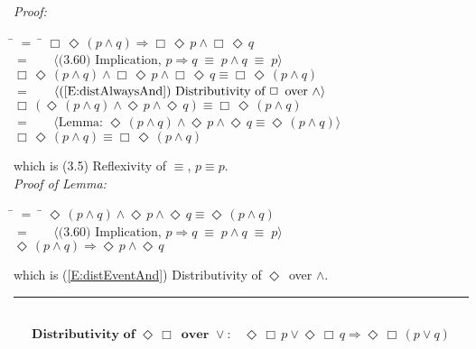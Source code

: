 \documentclass[fleqn, leqno]{article}
\newcommand{\lgap}{2pt}                             %
\newcommand{\mymathindent}{24pt}                    %
\newcommand{\equivs}{\ensuremath{\;\equiv\;}}       %
\newcommand{\impl}{\ensuremath{\Rightarrow}}        %
\newcommand{\Event}{\Diamond\,}
\newcommand{\Always}{\Box\,}
\newcommand{\myqed}{\hfill\rule[-.23ex]{1.2ex}{2.0ex}}
\newcommand{\Gll} {\langle}                         %
\newcommand{\Ggg} {\rangle}                         %
\newcommand{\Hint}[1]     {\ \ \ $\Gll              \mbox{#1} \Ggg$ }   %
\begin{document}
\emph{Proof:}
\begin{tabbing}
\hspace{\mymathindent} \= $= \;$ \= \kill
  \> \>   $\Always\Event(p \land q) \impl \Always\Event p \land \Always\Event q$\\[\lgap]
  \> $=$  \>  \Hint{(3.60) Implication, $p\impl q \equivs p\land q \equivs p$}\\[\lgap]
  \> \>   $\Always\Event(p \land q) \land \Always\Event p \land \Always\Event q \equiv \Always\Event(p \land q)$\\[\lgap]
  \> $=$  \>  \Hint{(\ref{E:distAlwaysAnd}) Distributivity of $\Always$ over $\land$}\\[\lgap]
  \> \>   $\Always(\Event(p \land q) \land \Event p \land \Event q) \equiv \Always\Event(p \land q)$\\[\lgap]
  \> $=$  \>  \Hint{Lemma: $\Event(p \land q) \land \Event p \land \Event q \equiv \Event(p \land q)$}\\[\lgap]
  \> \>   $\Always\Event(p \land q) \equiv \Always\Event(p \land q)$
\end{tabbing}
which is (3.5) Reflexivity of $\equiv$, $p\equiv p$.\\[\lgap]

\emph{Proof of Lemma:}
\begin{tabbing}
\hspace{\mymathindent} \= $= \;$ \= \kill
  \> \>   $\Event(p \land q) \land \Event p \land \Event q \equiv \Event(p \land q)$\\[\lgap]
  \> $=$  \>  \Hint{(3.60) Implication, $p\impl q \equivs p\land q \equivs p$}\\[\lgap]
  \> \>   $\Event(p \land q) \impl \Event p \land \Event q$
\end{tabbing}
which is (\ref{E:distEventAnd}) Distributivity of $\Event$ over $\land$. \myqed\\[\lgap]

\begin{equation}\label{E:distEventAlwaysOr}
\textbf{Distributivity of $\Event\Always$ over $\lor$:}\quad \Event\Always p \lor \Event\Always q \impl \Event\Always (p \lor q)
\end{equation}
\end{document}
